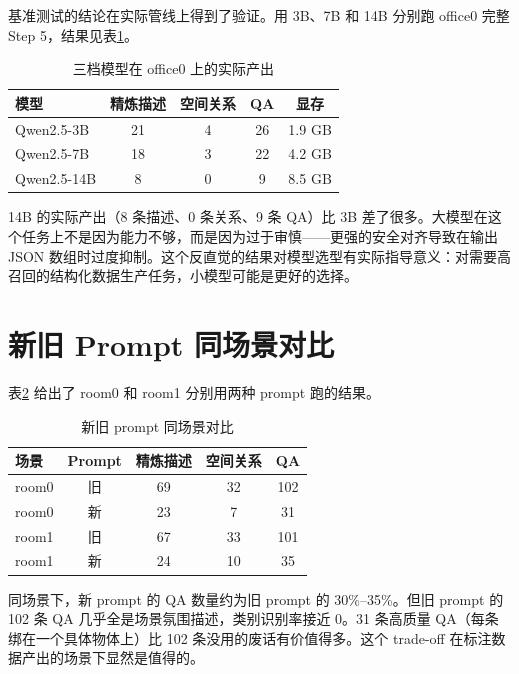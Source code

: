 基准测试的结论在实际管线上得到了验证。用 3B、7B 和 14B 分别跑 office0 完整 Step 5，结果见表\ref{tab:model_pipeline_compare}。

\begin{table}[H]
\centering
\caption{三档模型在 office0 上的实际产出}
\label{tab:model_pipeline_compare}
\begin{tabular}{lcccc}
\toprule
\textbf{模型} & \textbf{精炼描述} & \textbf{空间关系} & \textbf{QA} & \textbf{显存} \\
\midrule
Qwen2.5-3B & 21 & 4 & 26 & 1.9 GB \\
Qwen2.5-7B & 18 & 3 & 22 & 4.2 GB \\
Qwen2.5-14B & 8 & 0 & 9 & 8.5 GB \\
\bottomrule
\end{tabular}
\end{table}

14B 的实际产出（8 条描述、0 条关系、9 条 QA）比 3B 差了很多。大模型在这个任务上不是因为能力不够，而是因为过于审慎——更强的安全对齐导致在输出 JSON 数组时过度抑制。这个反直觉的结果对模型选型有实际指导意义：对需要高召回的结构化数据生产任务，小模型可能是更好的选择。

\section{新旧 Prompt 同场景对比}

表\ref{tab:prompt_cross_scene} 给出了 room0 和 room1 分别用两种 prompt 跑的结果。

\begin{table}[H]
\centering
\caption{新旧 prompt 同场景对比}
\label{tab:prompt_cross_scene}
\begin{tabular}{lcccc}
\toprule
\textbf{场景} & \textbf{Prompt} & \textbf{精炼描述} & \textbf{空间关系} & \textbf{QA} \\
\midrule
room0 & 旧 & 69 & 32 & 102 \\
room0 & 新 & 23 & 7 & 31 \\
room1 & 旧 & 67 & 33 & 101 \\
room1 & 新 & 24 & 10 & 35 \\
\bottomrule
\end{tabular}
\end{table}

同场景下，新 prompt 的 QA 数量约为旧 prompt 的 30\%--35\%。但旧 prompt 的 102 条 QA 几乎全是场景氛围描述，类别识别率接近 0。31 条高质量 QA（每条绑在一个具体物体上）比 102 条没用的废话有价值得多。这个 trade-off 在标注数据产出的场景下显然是值得的。


